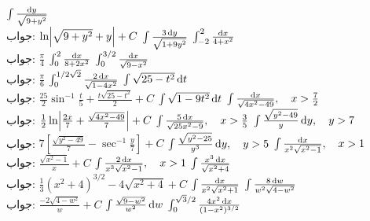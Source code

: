 $\int\frac{\dif y}{\sqrt{9+y^2}}$\\
جواب:\quad
$\ln\abs{\sqrt{9+y^2}+y}+C$
$\int\frac{3\dif y}{\sqrt{1+9y^2}}$
$\int_{-2}^2\frac{\dif x}{4+x^2}$\\
جواب:\quad
$\tfrac{\pi}{4}$
$\int_0^2\frac{\dif x}{8+2x^2}$
$\int_0^{3/2}\frac{\dif x}{\sqrt{9-x^2}}$\\
جواب:\quad
$\tfrac{\pi}{6}$
$\int_0^{1/2\sqrt{2}}\frac{2\dif x}{\sqrt{1-4x^2}}$
$\int\sqrt{25-t^2}\dif t$\\
جواب:\quad
$\tfrac{25}{2}\sin^{-1}\tfrac{t}{5}+\tfrac{t\sqrt{25-t^2}}{2}+C$
$\int\sqrt{1-9t^2}\dif t$
$\int\frac{\dif x}{\sqrt{4x^2-49}},\quad x>\frac{7}{2}$\\
جواب:\quad
$\tfrac{1}{2}\ln\abs{\tfrac{2x}{7}+\tfrac{\sqrt{4x^2-49}}{7}}+C$
$\int\frac{5\dif x}{\sqrt{25x^2-9}},\quad x>\frac{3}{5}$
$\int\frac{\sqrt{y^2-49}}{y}\dif y,\quad y>7$\\
جواب:\quad
$7[\tfrac{\sqrt{y^2-49}}{7}-\sec^{-1}\tfrac{y}{7}]+C$
$\int\frac{\sqrt{y^2-25}}{y^3}\dif y,\quad y>5$
$\int\frac{\dif x}{x^2\sqrt{x^2-1}},\quad x>1$\\
جواب:\quad
$\tfrac{\sqrt{x^2-1}}{x}+C$ 
$\int\frac{2\dif x}{x^3\sqrt{x^2-1}},\quad x>1$
$\int\frac{x^3\dif x}{\sqrt{x^2+4}}$\\
جواب:\quad
$\tfrac{1}{3}(x^2+4)^{3/2}-4\sqrt{x^2+4}+C$
$\int\frac{\dif x}{x^2\sqrt{x^2+1}}$
$\int\frac{8\dif w}{w^2\sqrt{4-w^2}}$\\
جواب:\quad
$\tfrac{-2\sqrt{4-w^2}}{w}+C$ 
$\int\frac{\sqrt{9-w^2}}{w^2}\dif w$
$\int_0^{\sqrt{3}/2}\frac{4x^2\dif x}{(1-x^2)^{3/2}}$\\

